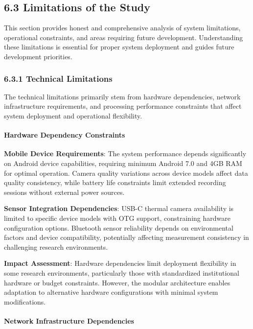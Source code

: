 \documentclass[12pt,a4paper]{article}
\begin{document}
\subsection{6.3 Limitations of the Study}

This section provides honest and comprehensive analysis of system limitations, operational constraints, and areas
requiring future development. Understanding these limitations is essential for proper system deployment and guides
future development priorities.

\subsubsection{6.3.1 Technical Limitations}

The technical limitations primarily stem from hardware dependencies, network infrastructure requirements, and processing
performance constraints that affect system deployment and operational flexibility.

\paragraph{Hardware Dependency Constraints}

\textbf{Mobile Device Requirements}: The system performance depends significantly on Android device capabilities, requiring
minimum Android 7.0 and 4GB RAM for optimal operation. Camera quality variations across device models affect data
quality consistency, while battery life constraints limit extended recording sessions without external power sources.

\textbf{Sensor Integration Dependencies}: USB-C thermal camera availability is limited to specific device models with OTG
support, constraining hardware configuration options. Bluetooth sensor reliability depends on environmental factors and
device compatibility, potentially affecting measurement consistency in challenging research environments.

\textbf{Impact Assessment}: Hardware dependencies limit deployment flexibility in some research environments, particularly
those with standardized institutional hardware or budget constraints. However, the modular architecture enables
adaptation to alternative hardware configurations with minimal system modifications.

\paragraph{Network Infrastructure Dependencies}
\end{document}
